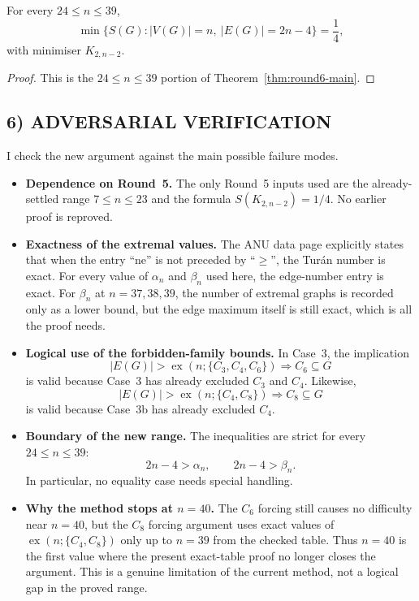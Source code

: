 \begin{corollary}[New exact range on the $a=2$ complete-bipartite line]
For every $24\le n\le 39$,
\[
\min\{S(G): |V(G)|=n,\ |E(G)|=2n-4\}=\frac14,
\]
with minimiser $K_{2,n-2}$.
\end{corollary}

\begin{proof}
This is the $24\le n\le 39$ portion of Theorem~\ref{thm:round6-main}.
\end{proof}

\subsection*{6) ADVERSARIAL VERIFICATION}

I check the new argument against the main possible failure modes.

\begin{itemize}
\item \textbf{Dependence on Round~5.}
The only Round~5 inputs used are the already-settled range $7\le n\le 23$ and the formula $S(K_{2,n-2})=1/4$.
No earlier proof is reproved.

\item \textbf{Exactness of the extremal values.}
The ANU data page explicitly states that when the entry ``ne'' is not preceded by ``$\ge$'', the Tur\'an number is exact.
For every value of $\alpha_n$ and $\beta_n$ used here, the edge-number entry is exact.
For $\beta_n$ at $n=37,38,39$, the number of extremal graphs is recorded only as a lower bound, but the edge maximum itself is still exact, which is all the proof needs.

\item \textbf{Logical use of the forbidden-family bounds.}
In Case~3, the implication
\[
|E(G)|>\operatorname{ex}(n;\{C_3,C_4,C_6\}) \Longrightarrow C_6\subseteq G
\]
is valid because Case~3 has already excluded $C_3$ and $C_4$.
Likewise,
\[
|E(G)|>\operatorname{ex}(n;\{C_4,C_8\}) \Longrightarrow C_8\subseteq G
\]
is valid because Case~3b has already excluded $C_4$.

\item \textbf{Boundary of the new range.}
The inequalities are strict for every $24\le n\le 39$:
\[
2n-4>\alpha_n,
\qquad
2n-4>\beta_n.
\]
In particular, no equality case needs special handling.

\item \textbf{Why the method stops at $n=40$.}
The $C_6$ forcing still causes no difficulty near $n=40$, but the $C_8$ forcing argument uses exact values of $\operatorname{ex}(n;\{C_4,C_8\})$ only up to $n=39$ from the checked table.
Thus $n=40$ is the first value where the present exact-table proof no longer closes the argument.
This is a genuine limitation of the current method, not a logical gap in the proved range.
\end{itemize}

